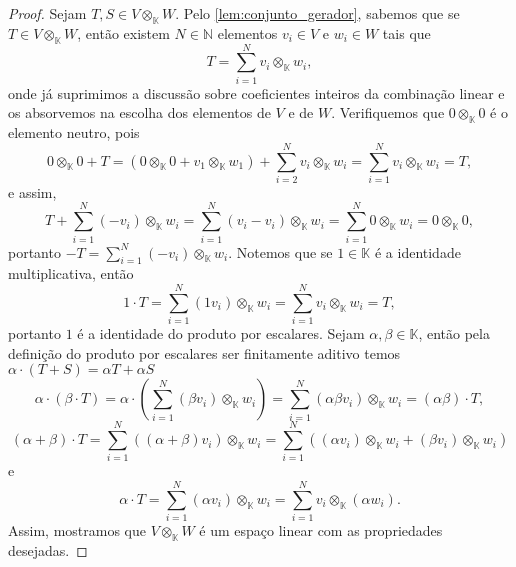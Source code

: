 \begin{proof}
    Sejam \(T, S \in V \otimes_{\mathbb{K}}W\). Pelo \cref{lem:conjunto_gerador}, sabemos que se \(T \in V \otimes_{\mathbb{K}} W\), então existem \(N \in \mathbb{N}\) elementos \(v_i \in V\) e \(w_i \in W\) tais que
    \begin{equation*}
        T = \sum_{i = 1}^N v_i \otimes_{\mathbb{K}} w_i,
    \end{equation*}
    onde já suprimimos a discussão sobre coeficientes inteiros da combinação linear e os absorvemos na escolha dos elementos de \(V\) e de \(W\). Verifiquemos que \(0 \otimes_\mathbb{K} 0\) é o elemento neutro, pois
    \begin{equation*}
        0 \otimes_{\mathbb{K}} 0 + T = (0 \otimes_{\mathbb{K}} 0 + v_1 \otimes_{\mathbb{K}} w_1) + \sum_{i = 2}^N v_i \otimes_{\mathbb{K}} w_i = \sum_{i = 1}^N v_i \otimes_{\mathbb{K}} w_i = T,
    \end{equation*}
    e assim,
    \begin{equation*}
        T + \sum_{i =1}^N (-v_i) \otimes_{\mathbb{K}} w_i = \sum_{i = 1}^N (v_i - v_i) \otimes_{\mathbb{K}} w_i = \sum_{i=1}^N 0 \otimes_{\mathbb{K}} w_i = 0\otimes_\mathbb{K} 0,
    \end{equation*}
    portanto \(-T = \sum_{i = 1}^N (-v_i)\otimes_{\mathbb{K}} w_i\).
    Notemos que se \(1 \in \mathbb{K}\) é a identidade multiplicativa, então
    \begin{equation*}
        1 \cdot T = \sum_{i = 1}^N (1 v_i)\otimes_{\mathbb{K}} w_i = \sum_{i = 1}^N v_i \otimes _{\mathbb{K}} w_i = T,
    \end{equation*}
    portanto \(1\) é a identidade do produto por escalares.
    Sejam \(\alpha, \beta \in \mathbb{K}\), então  pela definição do produto por escalares ser finitamente aditivo temos \(\alpha \cdot (T + S) = \alpha T + \alpha S\)
    \begin{equation*}
        \alpha \cdot \left( \beta \cdot T\right) = \alpha \cdot \left( \sum_{i = 1}^N (\beta v_i)\otimes_{\mathbb{K}} w_i \right) = \sum_{i = 1}^N (\alpha \beta v_i) \otimes_{\mathbb{K}} w_i = (\alpha \beta) \cdot T,
    \end{equation*}
    \begin{equation*}
        (\alpha + \beta) \cdot T = \sum_{i = 1}^N ((\alpha + \beta) v_i) \otimes_{\mathbb{K}} w_i = \sum_{i = 1}^N \left((\alpha v_i) \otimes_{\mathbb{K}} w_i + (\beta v_i) \otimes_{\mathbb{K}} w_i\right)
    \end{equation*}
    e
    \begin{equation*}
        \alpha \cdot T = \sum_{i = 1}^N (\alpha v_i) \otimes_{\mathbb{K}} w_i = \sum_{i = 1}^N v_i \otimes_{\mathbb{K}} (\alpha w_i).
    \end{equation*}
    Assim, mostramos que \(V \otimes_{\mathbb{K}} W\) é um espaço linear com as propriedades desejadas.
\end{proof}
